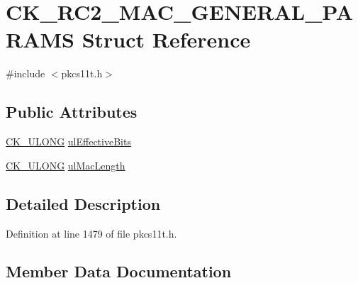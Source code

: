 \hypertarget{struct_c_k___r_c2___m_a_c___g_e_n_e_r_a_l___p_a_r_a_m_s}{}\section{C\+K\+\_\+\+R\+C2\+\_\+\+M\+A\+C\+\_\+\+G\+E\+N\+E\+R\+A\+L\+\_\+\+P\+A\+R\+A\+MS Struct Reference}
\label{struct_c_k___r_c2___m_a_c___g_e_n_e_r_a_l___p_a_r_a_m_s}


{\ttfamily \#include $<$pkcs11t.\+h$>$}

\subsection*{Public Attributes}
\begin{DoxyCompactItemize}
\item 
\hyperlink{pkcs11t_8h_a35181858a3b7a0a81f49d180d8f446ef}{C\+K\+\_\+\+U\+L\+O\+NG} \hyperlink{struct_c_k___r_c2___m_a_c___g_e_n_e_r_a_l___p_a_r_a_m_s_aa77745a17e02336c24ce0f1a77ba0844}{ul\+Effective\+Bits}
\item 
\hyperlink{pkcs11t_8h_a35181858a3b7a0a81f49d180d8f446ef}{C\+K\+\_\+\+U\+L\+O\+NG} \hyperlink{struct_c_k___r_c2___m_a_c___g_e_n_e_r_a_l___p_a_r_a_m_s_afb7e767a2898dbb3a13e86a2799fc5b5}{ul\+Mac\+Length}
\end{DoxyCompactItemize}


\subsection{Detailed Description}


Definition at line 1479 of file pkcs11t.\+h.



\subsection{Member Data Documentation}
\mbox{\label{struct_c_k___r_c2___m_a_c___g_e_n_e_r_a_l___p_a_r_a_m_s_aa77745a17e02336c24ce0f1a77ba0844}} 
